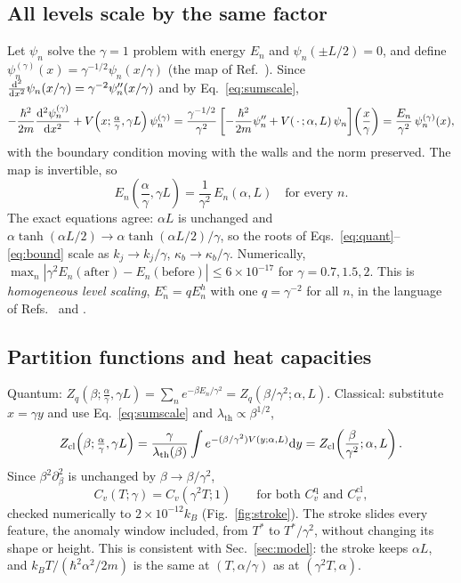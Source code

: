 \documentclass[11pt]{article}
\numberwithin{equation}{section}
\newcommand{\lth}{\lambda_{\mathrm{th}}}
\newcommand{\Cq}{C_v^{\mathrm{q}}}
\newcommand{\Ccl}{C_v^{\mathrm{cl}}}
\newcommand{\kB}{k_{B}}
\newcommand{\Eu}{\hbar^2\alpha^2/2m}
\begin{document}
\subsection{All levels scale by the same factor}
Let $\psi_n$ solve the $\gamma=1$ problem with energy $E_n$ and $\psi_n(\pm L/2)=0$, and define $\psi_n^{(\gamma)}(x)=\gamma^{-1/2}\psi_n(x/\gamma)$ (the map of Ref.~\cite[p.~021013-14, App.~A]{deffner2014}). Since $\dv[2]{x}\psi_n(x/\gamma)=\gamma^{-2}\psi_n''(x/\gamma)$ and by Eq.~\eqref{eq:sumscale},
\[
-\frac{\hbar^2}{2m}\dv[2]{\psi_n^{(\gamma)}}{x}+V\!\left(x;\tfrac\alpha\gamma,\gamma L\right)\psi_n^{(\gamma)}
=\frac{\gamma^{-1/2}}{\gamma^2}\left[-\frac{\hbar^2}{2m}\psi_n''+V(\,\cdot\,;\alpha,L)\,\psi_n\right]\!\left(\frac x\gamma\right)=\frac{E_n}{\gamma^2}\,\psi_n^{(\gamma)}(x),
\]
with the boundary condition moving with the walls and the norm preserved. The map is invertible, so
\begin{equation}
\boxed{\;E_n\!\left(\frac\alpha\gamma,\gamma L\right)=\frac{1}{\gamma^2}\,E_n(\alpha,L)\quad\text{for every }n.\;}
\label{eq:Escale}
\end{equation}
The exact equations agree: $\alpha L$ is unchanged and $\alpha\tanh(\alpha L/2)\to\alpha\tanh(\alpha L/2)/\gamma$, so the roots of Eqs.~\eqref{eq:quant}--\eqref{eq:bound} scale as $k_j\to k_j/\gamma$, $\kappa_b\to\kappa_b/\gamma$. Numerically, $\max_n|\gamma^2E_n(\text{after})-E_n(\text{before})|\le6\times10^{-17}$ for $\gamma=0.7,1.5,2$. This is \emph{homogeneous level scaling}, $E_n^{c}=qE_n^{h}$ with one $q=\gamma^{-2}$ for all $n$, in the language of Refs.~\cite[p.~2]{GK} and \cite[p.~92]{LGK}.

\subsection{Partition functions and heat capacities}
Quantum: $Z_q(\beta;\frac\alpha\gamma,\gamma L)=\sum_ne^{-\beta E_n/\gamma^2}=Z_q(\beta/\gamma^2;\alpha,L)$. Classical: substitute $x=\gamma y$ and use Eq.~\eqref{eq:sumscale} and $\lth\propto\beta^{1/2}$,
\[
Z_{\rm cl}\!\left(\beta;\tfrac\alpha\gamma,\gamma L\right)=\frac{\gamma}{\lth(\beta)}\int e^{-(\beta/\gamma^2)V(y;\alpha,L)}\dd y=Z_{\rm cl}\!\left(\frac{\beta}{\gamma^2};\alpha,L\right).
\]
Since $\beta^2\partial_\beta^2$ is unchanged by $\beta\to\beta/\gamma^2$,
\begin{equation}
C_v(T;\gamma)=C_v(\gamma^2T;1)\qquad\text{for both }\Cq\text{ and }\Ccl,
\label{eq:Cvscale}
\end{equation}
checked numerically to $2\times10^{-12}\kB$ (Fig.~\ref{fig:stroke}). The stroke slides every feature, the anomaly window included, from $T^*$ to $T^*/\gamma^2$, without changing its shape or height. This is consistent with Sec.~\ref{sec:model}: the stroke keeps $\alpha L$, and $\kB T/(\Eu)$ is the same at $(T,\alpha/\gamma)$ as at $(\gamma^2T,\alpha)$.
\end{document}
